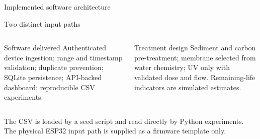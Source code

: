 \documentclass[aspectratio=169,10pt]{beamer}
\begin{document}
\begin{frame}{Implemented software architecture}
\begin{block}{Two distinct input paths}
\centering
{}
\end{block}
\begin{columns}[T,onlytextwidth]
  \begin{block}{Software delivered}
    Authenticated device ingestion; range and timestamp validation; duplicate prevention; SQLite persistence; API-backed dashboard; reproducible CSV experiments.
  \end{block}
  \begin{block}{Treatment design}
    Sediment and carbon pre-treatment; membrane selected from water chemistry; UV only with validated dose and flow. Remaining-life indicators are simulated estimates.
  \end{block}
\end{columns}
\vspace{0.15em}
{\tiny The CSV is loaded by a seed script and read directly by Python experiments. The physical ESP32 input path is supplied as a firmware template only.}
\end{frame}
\end{document}
